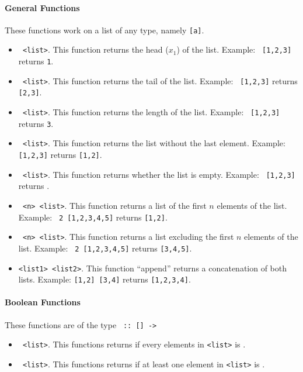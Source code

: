 \paragraph{General Functions} These functions work on a list of any type, namely \texttt{[a]}.
\begin{itemize}
  \item \texttt{ <list>}. This function returns the head ($x_1$) of the list. Example: \texttt{ [1,2,3]} returns \texttt{1}.
  \item \texttt{ <list>}. This function returns the tail of the list. Example: \texttt{ [1,2,3]} returns \texttt{[2,3]}.
  \item \texttt{ <list>}. This function returns the length of the list. Example: \texttt{ [1,2,3]} returns \texttt{3}.
  \item \texttt{ <list>}. This function returns the list without the last element. Example: \texttt{ [1,2,3]} returns \texttt{[1,2]}.
  \item \texttt{ <list>}. This function returns whether the list is empty. Example: \texttt{ [1,2,3]} returns \texttt{}.
  \item \texttt{ <n> <list>}. This function returns a list of the first $n$ elements of the list. Example: \texttt{ 2 [1,2,3,4,5]} returns \texttt{[1,2]}.
  \item \texttt{ <n> <list>}. This function returns a list excluding the first $n$ elements of the list. Example: \texttt{ 2 [1,2,3,4,5]} returns \texttt{[3,4,5]}.
  \item \texttt{<list1> \blue{++} <list2>}. This function ``append'' returns a concatenation of both lists. Example: \texttt{[1,2] \blue{++} [3,4]} returns \texttt{[1,2,3,4]}.
\end{itemize}

\paragraph{Boolean Functions} These functions are of the type \texttt{ :: [] -> }
\begin{itemize}
  \item \texttt{ <list>}. This functions returns \texttt{} if every elements in \texttt{<list>} is \texttt{}.
  \item \texttt{ <list>}. This functions returns \texttt{} if at least one element in \texttt{<list>} is \texttt{}.
\end{itemize}


